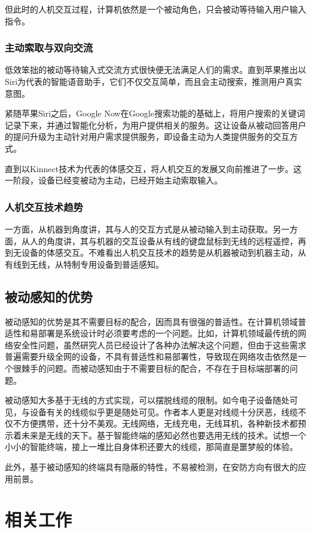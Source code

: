 但此时的人机交互过程，计算机依然是一个被动角色，只会被动等待输入用户输入指令。
\subsubsection{主动索取与双向交流}

低效笨拙的被动等待输入式交流方式很快便无法满足人们的需求。直到苹果推出以Siri为代表的智能语音助手，它们不仅交互简单，而且会主动搜索，推测用户真实意图。

紧随苹果Siri之后，Google Now在Google搜索功能的基础上，将用户搜索的关键词记录下来，并通过智能化分析，为用户提供相关的服务。这让设备从被动回答用户的提问升级为主动针对用户需求提供服务，即设备主动为人类提供服务的交互方式。

直到以Kinnect技术为代表的体感交互，将人机交互的发展又向前推进了一步。这一阶段，设备已经变被动为主动，已经开始主动索取输入。

\subsubsection{人机交互技术趋势}

一方面，从机器到角度讲，其与人的交互方式是从被动输入到主动获取。另一方面，从人的角度讲，其与机器的交互设备从有线的键盘鼠标到无线的远程遥控，再到无设备的体感交互。不难看出人机交互技术的趋势是从机器被动到机器主动，从有线到无线，从特制专用设备到普适感知。

\subsection{被动感知的优势}
被动感知的优势是其不需要目标的配合，因而具有很强的普适性。在计算机领域普适性和易部署是系统设计时必须要考虑的一个问题。比如，计算机领域最传统的网络安全性问题，虽然研究人员已经设计了各种办法解决这个问题，但由于这些需求普遍需要升级全网的设备，不具有普适性和易部署性，导致现在网络攻击依然是一个很棘手的问题。而被动感知由于不需要目标的配合，不存在于目标端部署的问题。

被动感知大多基于无线的方式实现，可以摆脱线缆的限制。如今电子设备随处可见，与设备有关的线缆似乎更是随处可见。作者本人更是对线缆十分厌恶，线缆不仅不方便携带，还十分不美观。无线网络，无线充电，无线耳机，各种新技术都预示着未来是无线的天下。基于智能终端的感知必然也要选用无线的技术。试想一个小小的智能终端，接上一堆比自身体积还要大的线缆，那简直是噩梦般的体验。

此外，基于被动感知的终端具有隐蔽的特性，不易被检测，在安防方向有很大的应用前景。


\section{相关工作}

